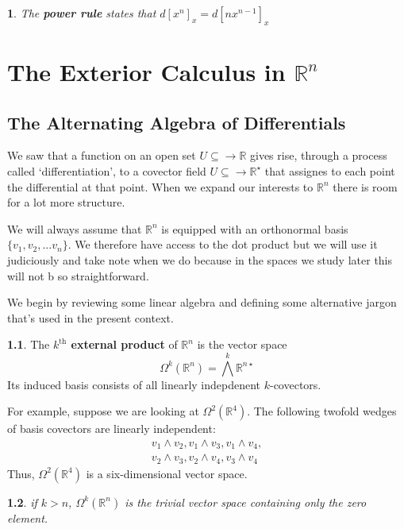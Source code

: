 \documentclass[oneside,english]{amsbook}
\numberwithin{section}{chapter}
\theoremstyle{plain}
\newtheorem{thm}{\protect\theoremname}
\theoremstyle{definition}
\newtheorem{defn}[thm]{\protect\definitionname}
\providecommand{\definitionname}{Definition}
\providecommand{\theoremname}{Theorem}
\begin{document}
			\begin{thm}
				The \textbf{power rule} states that $d[x^n]_x = d[nx^{n-1}]_x$
			\end{thm}

	\chapter{The Exterior Calculus in $\mathbb{R}^n$}
	
		\section{The Alternating Algebra of Differentials}
		
			We saw that a function on an open set $U\subseteq \to \mathbb{R}$ gives rise, through a process called `differentiation', to a covector field $U\subseteq \to \mathbb{R}^\star$ that assignes to each point the differential at that point. When we expand our interests to $\mathbb{R}^n$ there is room for a lot more structure.
			
			We will always assume that $\mathbb{R}^n$ is equipped with an orthonormal basis $\{v_1, v_2, ... v_n\}$. We therefore have access to the dot product but we will use it judiciously and take note when we do because in the spaces we study later this will not b so straightforward.
			
			We begin by reviewing some linear algebra and defining some alternative jargon that's used in the present context.
			
			\begin{defn}
				The \textbf{$k^{\text{th}}$ external product} of $\mathbb{R}^{n}$ is the vector space
					\[
						\Omega^k(\mathbb{R}^{n}) = \bigwedge^k \mathbb{R}^{n\star}
					\] 
				Its induced basis consists of all linearly indepdenent $k$-covectors.
			\end{defn}
			
			For example, suppose we are looking at $\Omega^2(\mathbb{R}^{4})$. The following twofold wedges of basis covectors are linearly independent:
				\begin{align}[c]
					v_1\wedge v_2, v_1\wedge v_3, v_1\wedge v_4, \\
					v_2\wedge v_3, v_2\wedge v_4, v_3\wedge v_4
				\end{align}
			Thus, $\Omega^2(\mathbb{R}^{4})$ is a six-dimensional vector space.
			
			\begin{thm}
				if $k > n$, $\Omega^k(\mathbb{R}^{n})$ is the trivial vector space containing only the zero element.
			\end{thm}
			
\end{document}
